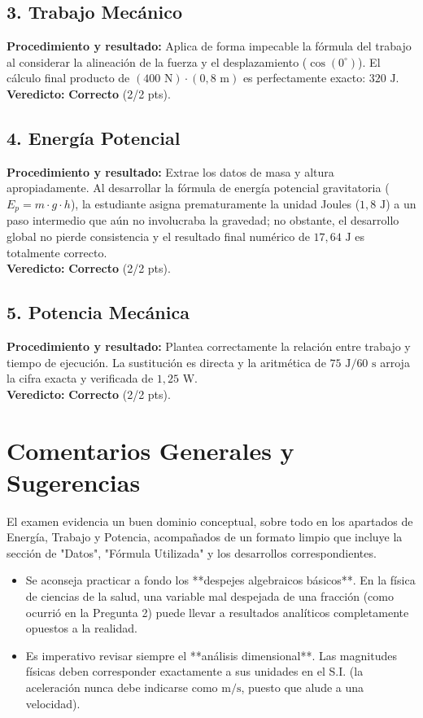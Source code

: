 \documentclass[12pt,letterpaper]{article}
\begin{document}
\subsection*{3. Trabajo Mecánico}
\textbf{Procedimiento y resultado:} Aplica de forma impecable la fórmula del trabajo al considerar la alineación de la fuerza y el desplazamiento ($\cos(0^\circ)$). El cálculo final producto de $(400 \text{ N}) \cdot (0,8 \text{ m})$ es perfectamente exacto: $320 \text{ J}$. \\
\textbf{Veredicto:} \textbf{Correcto} (2/2 pts).

\subsection*{4. Energía Potencial}
\textbf{Procedimiento y resultado:} Extrae los datos de masa y altura apropiadamente. Al desarrollar la fórmula de energía potencial gravitatoria ($E_p = m \cdot g \cdot h$), la estudiante asigna prematuramente la unidad Joules ($1,8 \text{ J}$) a un paso intermedio que aún no involucraba la gravedad; no obstante, el desarrollo global no pierde consistencia y el resultado final numérico de $17,64 \text{ J}$ es totalmente correcto. \\
\textbf{Veredicto:} \textbf{Correcto} (2/2 pts).

\subsection*{5. Potencia Mecánica}
\textbf{Procedimiento y resultado:} Plantea correctamente la relación entre trabajo y tiempo de ejecución. La sustitución es directa y la aritmética de $75 \text{ J} / 60 \text{ s}$ arroja la cifra exacta y verificada de $1,25 \text{ W}$. \\
\textbf{Veredicto:} \textbf{Correcto} (2/2 pts).

\vspace{0.5cm}
\section*{Comentarios Generales y Sugerencias}
El examen evidencia un buen dominio conceptual, sobre todo en los apartados de Energía, Trabajo y Potencia, acompañados de un formato limpio que incluye la sección de "Datos", "Fórmula Utilizada" y los desarrollos correspondientes.
\begin{itemize}
    \item Se aconseja practicar a fondo los **despejes algebraicos básicos**. En la física de ciencias de la salud, una variable mal despejada de una fracción (como ocurrió en la Pregunta 2) puede llevar a resultados analíticos completamente opuestos a la realidad.
    \item Es imperativo revisar siempre el **análisis dimensional**. Las magnitudes físicas deben corresponder exactamente a sus unidades en el S.I. (la aceleración nunca debe indicarse como $\text{m/s}$, puesto que alude a una velocidad).
\end{itemize}
\end{document}
